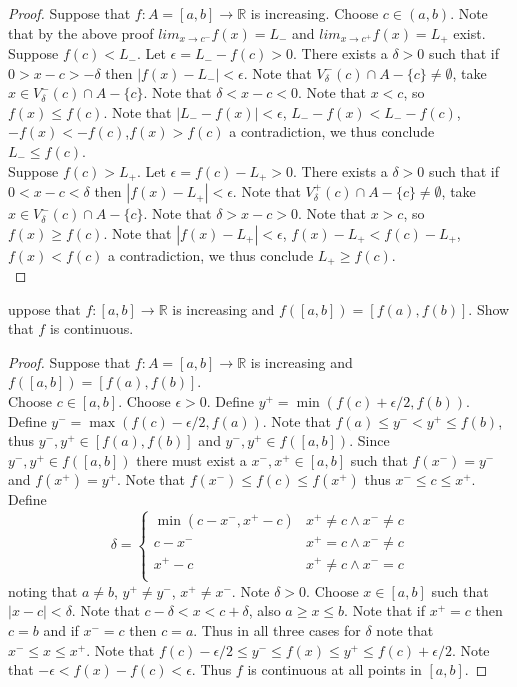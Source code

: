 \documentclass[12pt]{article}
\makeatletter
\theoremstyle{homework}
\newenvironment{exercise}[1]
{\def\@currentlabel{#1}\exercisecore}
{\endexercisecore}
\makeatother
\begin{document}
\begin{proof}
Suppose that $f : A=[a, b] \rightarrow \mathbb{R}$ is increasing.  Choose $c \in (a, b)$.  Note that by the above proof $lim_{x\rightarrow c^-} f (x)=L_-$ and $lim_{x\rightarrow c^+} f (x)=L_+$ exist.\\
Suppose $f (c)<L_- $.  Let $\epsilon=L_--f(c)>0$.  There exists a $\delta>0$ such that if $0>x-c>-\delta$ then $|f(x)-L_-|<\epsilon$.  Note that $V^-_\delta(c)\cap A-\{c\}\neq \emptyset$, take $x\in V^-_\delta(c)\cap A-\{c\}$.  Note that $\delta< x-c < 0$.  Note that $x<c$, so $f(x)\leq f(c)$.  Note that $|L_--f(x)|<\epsilon$, $L_--f(x)<L_--f(c)$, $-f(x)<-f(c)$,$f(x)>f(c)$ a contradiction, we thus conclude $L_-\leq f (c)$.\\
Suppose $f (c)>L_+ $.  Let $\epsilon=f(c)-L_+>0$.  There exists a $\delta>0$ such that if $0<x-c<\delta$ then $|f(x)-L_+|<\epsilon$.  Note that $V^+_\delta(c)\cap A-\{c\}\neq \emptyset$, take $x\in V^-_\delta(c)\cap A-\{c\}$.  Note that $\delta> x-c > 0$.  Note that $x>c$, so $f(x)\geq f(c)$.  Note that $|f(x)-L_+|<\epsilon$, $f(x)-L_+<f(c)-L_+$, $f(x)<f(c)$ a contradiction, we thus conclude $L_+\geq f (c)$.\\
\end{proof}
\begin{exercise}

Suppose that $f : [a, b] \rightarrow \mathbb{R}$ is increasing and $f ([a, b]) = [f (a), f (b)]$. Show that $f$ is continuous.\\
\end{exercise}
\begin{proof}
Suppose that $f : A=[a, b] \rightarrow \mathbb{R}$ is increasing and $f ([a, b]) = [f (a), f (b)]$.\\
Choose $c\in [a,b]$.  Choose $\epsilon>0$.  Define $y^+=\min(f(c)+\epsilon/2,f(b))$.  Define $y^-=\max(f(c)-\epsilon/2 ,f(a))$.  Note that $f(a)\leq y^-<y^+\leq f(b)$, thus $y^-,y^+\in [f (a), f (b)]$ and $y^-,y^+\in f ([a, b])$.  Since $y^-,y^+\in f ([a, b])$ there must exist a $x^-,x^+\in[a, b]$ such that $f(x^-)=y^-$ and $f(x^+)=y^+$.  Note that $f(x^-)\leq f(c)\leq f(x^+)$ thus $x^-\leq c\leq x^+$.  Define 
$$\delta=\begin{cases} \min(c-x^-,x^+-c) & x^+\neq c \wedge x^-\neq c\\
c-x^- & x^+= c \wedge x^-\neq c\\
x^+-c & x^+\neq c \wedge x^-= c\\
\end{cases}$$ noting that $a\neq b$, $y^+\neq y^-$, $x^+\neq x^-$.  Note $\delta>0$.  Choose $x\in [a, b]$ such that $|x-c|<\delta$.  Note that $c-\delta<x<c+\delta$, also $a\geq x\leq b$.  Note that if $x^+= c$ then $c=b$ and if $x^-= c$ then $c=a$.  Thus in all three cases for $\delta$ note that $x^-\leq x\leq x^+$.  Note that $f(c)-\epsilon/2\leq y^-\leq f(x)\leq y^+\leq f(c)+\epsilon/2$.  Note that $-\epsilon<f(x)-f(c)<\epsilon$.  Thus $f$ is continuous at all points in $[a,b]$.
\end{proof}
\end{document}
